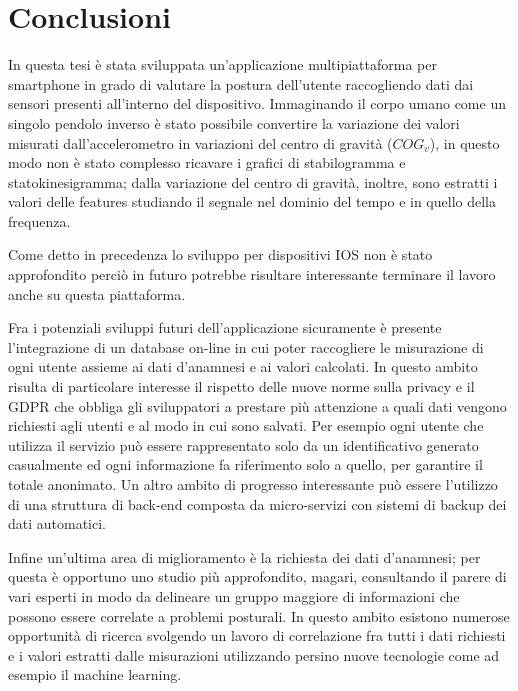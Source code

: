 \chapter{Conclusioni}
\label{cap:conclusioni}
In questa tesi è stata sviluppata un'applicazione multipiattaforma per smartphone in grado di valutare la postura dell'utente raccogliendo dati dai sensori presenti all'interno del dispositivo. Immaginando il corpo umano come un singolo pendolo inverso è stato possibile convertire la variazione dei valori misurati dall'accelerometro in variazioni del centro di gravità ($COG_v$), in questo modo non è stato complesso ricavare i grafici di stabilogramma e statokinesigramma; dalla variazione del centro di gravità, inoltre, sono estratti i valori delle features studiando il segnale nel dominio del tempo e in quello della frequenza.

Come detto in precedenza lo sviluppo per dispositivi IOS non è stato approfondito perciò in futuro potrebbe risultare interessante terminare il lavoro anche su questa piattaforma.

Fra i potenziali sviluppi futuri dell'applicazione sicuramente è presente l'integrazione di un database on-line in cui poter raccogliere le misurazione di ogni utente assieme ai dati d'anamnesi e ai valori calcolati. In questo ambito risulta di particolare interesse il rispetto delle nuove norme sulla privacy e il GDPR che obbliga gli sviluppatori a prestare più attenzione a quali dati vengono richiesti agli utenti e al modo in cui sono salvati. Per esempio ogni utente che utilizza il servizio può essere rappresentato solo da un identificativo generato casualmente ed ogni informazione fa riferimento solo a quello, per garantire il totale anonimato. Un altro ambito di progresso interessante può essere l'utilizzo di una struttura di back-end composta da micro-servizi con sistemi di backup dei dati automatici.

Infine un'ultima area di miglioramento è la richiesta dei dati d'anamnesi; per questa è opportuno uno studio più approfondito, magari, consultando il parere di vari esperti in modo da delineare un gruppo maggiore di informazioni che possono essere correlate a problemi posturali. In questo ambito esistono numerose opportunità di ricerca svolgendo un lavoro di correlazione fra tutti i dati richiesti e i valori estratti dalle misurazioni utilizzando persino nuove tecnologie come ad esempio il machine learning.